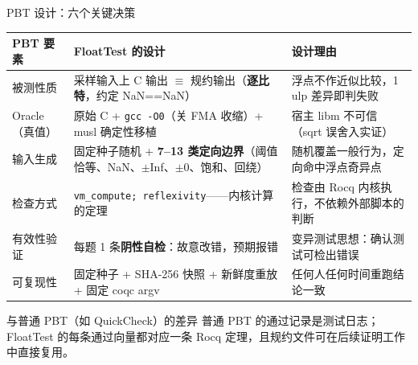 \documentclass[UTF8,aspectratio=169]{ctexbeamer}
\begin{document}
\begin{frame}{PBT 设计：六个关键决策}
  \centering\scriptsize
  \begin{tabular}{@{}lp{4.4cm}p{5.0cm}@{}}
    \toprule
    PBT 要素 & FloatTest 的设计 & 设计理由 \\
    \midrule
    被测性质 & 采样输入上 C 输出 $\equiv$ 规约输出（\textbf{逐比特}，约定 NaN==NaN） & 浮点不作近似比较，1 ulp 差异即判失败 \\
    Oracle（真值） & 原始 C + \texttt{gcc -O0}（关 FMA 收缩）+ musl 确定性移植 & 宿主 libm 不可信（sqrt 误舍入实证） \\
    输入生成 & 固定种子随机 + \textbf{7--13 类定向边界}（阈值恰等、NaN、$\pm$Inf、$\pm 0$、饱和、回绕） & 随机覆盖一般行为，定向命中浮点奇异点 \\
    检查方式 & \texttt{vm\_compute; reflexivity}——内核计算的定理 & 检查由 Rocq 内核执行，不依赖外部脚本的判断 \\
    有效性验证 & 每题 1 条\textbf{阴性自检}：故意改错，预期报错 & 变异测试思想：确认测试可检出错误 \\
    可复现性 & 固定种子 + SHA-256 快照 + 新鲜度重放 + 固定 coqc argv & 任何人任何时间重跑结论一致 \\
    \bottomrule
  \end{tabular}
  \vspace{0.5em}
  \begin{block}{与普通 PBT（如 QuickCheck）的差异}
    \small 普通 PBT 的通过记录是测试日志；FloatTest 的每条通过向量都对应一条 Rocq 定理，且规约文件可在后续证明工作中直接复用。
  \end{block}
\end{frame}
\end{document}
